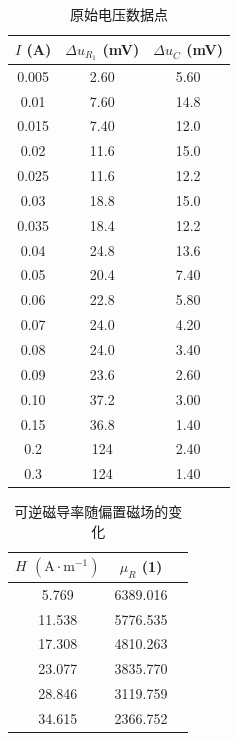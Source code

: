 \documentclass[UTF8]{article}
\theoremstyle{MyLineTheoremStyle} %
\theoremstyle{MyBlockTheoremStyle} %
\theoremstyle{MySubsubsectionStyle} %
\begin{document}
\begin{center}
\noindent\begin{minipage}{0.35\columnwidth}
\begin{table}[H]\centering
        \caption{原始电压数据点}
        \label{1.4电压}
    \begin{tabular}{ccc}\toprule
$I$ (A) & $\Delta u_{R_1}$ (mV) & $\Delta u_C$ (mV) \\
\midrule
0.005	& 2.60 & 5.60 \\
0.01	& 7.60 & 14.8 \\
0.015	& 7.40 & 12.0 \\
0.02	& 11.6 & 15.0 \\
0.025	& 11.6 & 12.2 \\
0.03	& 18.8 & 15.0 \\
0.035	& 18.4 & 12.2 \\
0.04	& 24.8 & 13.6 \\
0.05	& 20.4 & 7.40 \\
0.06	& 22.8 & 5.80 \\
0.07	& 24.0 & 4.20 \\
0.08	& 24.0 & 3.40 \\
0.09	& 23.6 & 2.60 \\
0.10	& 37.2 & 3.00 \\
0.15	& 36.8 & 1.40 \\
0.2	    & 124 & 2.40 \\
0.3	    & 124 & 1.40 \\
\bottomrule
    \end{tabular}
\end{table}
\end{minipage}\begin{minipage}{0.35\columnwidth}
\begin{table}[H]\centering
    \caption{可逆磁导率随偏置磁场的变化}
    \label{1.4换算后}
    \begin{tabular}{ccc}\toprule
$H$ $\mathrm{(A\cdot m^{-1})}$ & $\mu_R$ (1) \\
\midrule
5.769	& 6389.016 \\
11.538	& 5776.535 \\
17.308	& 4810.263 \\
23.077	& 3835.770 \\
28.846	& 3119.759 \\
34.615	& 2366.752 \\

\end{tabular}
\end{table}
\end{minipage}
\end{center}
\end{document}
